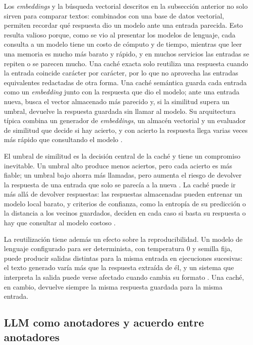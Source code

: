 Los \textit{embeddings} y la búsqueda vectorial descritos en la subsección anterior no solo sirven para comparar textos: combinados con una base de datos vectorial, permiten recordar qué respuesta dio un modelo ante una entrada parecida. Esto resulta valioso porque, como se vio al presentar los modelos de lenguaje, cada consulta a un modelo tiene un costo de cómputo y de tiempo, mientras que leer una memoria es mucho más barato y rápido, y en muchos servicios las entradas se repiten o se parecen mucho. Una caché exacta solo reutiliza una respuesta cuando la entrada coincide carácter por carácter, por lo que no aprovecha las entradas equivalentes redactadas de otra forma. Una caché semántica guarda cada entrada como un \textit{embedding} junto con la respuesta que dio el modelo; ante una entrada nueva, busca el vector almacenado más parecido y, si la similitud supera un umbral, devuelve la respuesta guardada sin llamar al modelo. Su arquitectura típica combina un generador de \textit{embeddings}, un almacén vectorial y un evaluador de similitud que decide si hay acierto, y con acierto la respuesta llega varias veces más rápido que consultando el modelo \cite{fu2023_gptcache}.

El umbral de similitud es la decisión central de la caché y tiene un compromiso inevitable. Un umbral alto produce menos aciertos, pero cada acierto es más fiable; un umbral bajo ahorra más llamadas, pero aumenta el riesgo de devolver la respuesta de una entrada que solo se parecía a la nueva \cite{ak2025_siu}. La caché puede ir más allá de devolver respuestas: las respuestas almacenadas pueden entrenar un modelo local barato, y criterios de confianza, como la entropía de su predicción o la distancia a los vecinos guardados, deciden en cada caso si basta su respuesta o hay que consultar al modelo costoso \cite{stogiannidis2023_cache}.

La reutilización tiene además un efecto sobre la reproducibilidad. Un modelo de lenguaje configurado para ser determinista, con temperatura 0 y semilla fija, puede producir salidas distintas para la misma entrada en ejecuciones sucesivas: el texto generado varía más que la respuesta extraída de él, y un sistema que interpreta la salida puede verse afectado cuando cambia su formato \cite{atil2025_nondeterminism}. Una caché, en cambio, devuelve siempre la misma respuesta guardada para la misma entrada.

\subsection{LLM como anotadores y acuerdo entre anotadores}\label{sec:mt_anotacion}

